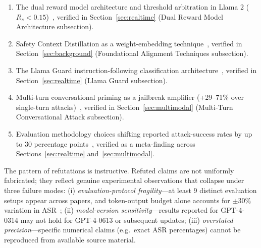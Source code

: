 \begin{enumerate}
  \item The dual reward model architecture and threshold arbitration in Llama 2
        ($R_s < 0.15$)~\cite{touvron2023llama2}, verified in
        Section~\ref{sec:realtime} (Dual Reward Model Architecture subsection).
  \item Safety Context Distillation as a weight-embedding technique~\cite{touvron2023llama2},
        verified in Section~\ref{sec:background} (Foundational Alignment Techniques
        subsection).
  \item The Llama Guard instruction-following classification
        architecture~\cite{inan2023llama}, verified in Section~\ref{sec:realtime}
        (Llama Guard subsection).
  \item Multi-turn conversational priming as a jailbreak amplifier (+29--71\% over
        single-turn attacks)~\cite{russinovich2024greatescalation,li2024llm},
        verified in Section~\ref{sec:multimodal} (Multi-Turn Conversational Attack
        subsection).
  \item Evaluation methodology choices shifting reported attack-success rates by up
        to 30 percentage points~\cite{li2024salad}, verified as a meta-finding
        across Sections~\ref{sec:realtime} and~\ref{sec:multimodal}.
\end{enumerate}

The pattern of refutations is instructive.
Refuted claims are not uniformly fabricated; they reflect genuine experimental
observations that collapse under three failure modes:
(i) \emph{evaluation-protocol fragility}---at least 9 distinct evaluation setups
appear across papers, and token-output budget alone accounts for $\pm$30\% variation
in ASR~\cite{li2024salad};
(ii) \emph{model-version sensitivity}---results reported for GPT-4-0314 may not hold
for GPT-4-0613 or subsequent updates;
(iii) \emph{overstated precision}---specific numerical claims (e.g.\ exact ASR
percentages) cannot be reproduced from available source material.

